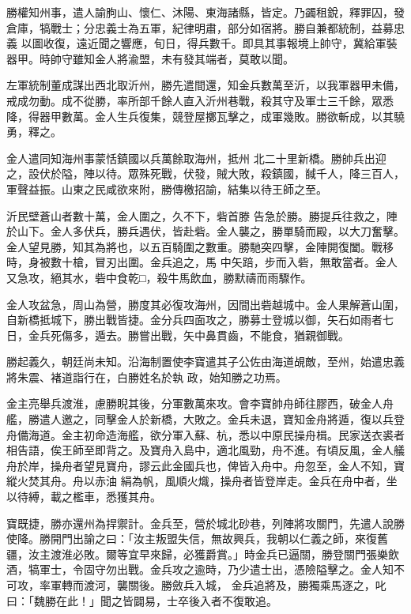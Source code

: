 \begin{pinyinscope}
 勝權知州事，遣人諭朐山、懷仁、沐陽、東海諸縣，皆定。乃蠲租銳，釋罪囚，發倉庫，犒戰士；分忠義士為五軍，紀律明肅，部分如宿將。勝自兼都統制，益募忠義
 以圖收復，遠近聞之響應，旬日，得兵數千。即具其事報境上帥守，冀給軍裝器甲。時帥守雖知金人將渝盟，未有發其端者，莫敢以聞。



 左軍統制董成謀出西北取沂州，勝先遣間還，知金兵數萬至沂，以我軍器甲未備，戒成勿動。成不從勝，率所部千餘人直入沂州巷戰，殺其守及軍士三千餘，眾悉降，得器甲數萬。金人生兵復集，競登屋擲瓦擊之，成軍幾敗。勝欲斬成，以其驍勇，釋之。



 金人遣同知海州事蒙恬鎮國以兵萬餘取海州，抵州
 北二十里新橋。勝帥兵出迎之，設伏於隘，陣以待。眾殊死戰，伏發，賊大敗，殺鎮國，馘千人，降三百人，軍聲益振。山東之民咸欲來附，勝傳檄招諭，結集以待王師之至。


沂民壁蒼山者數十萬，金人圍之，久不下，砦首滕
 告急於勝。勝提兵往救之，陣於山下。金人多伏兵，勝兵遇伏，皆赴砦。金人襲之，勝單騎而殿，以大刀奮擊。金人望見勝，知其為將也，以五百騎圍之數重。勝馳突四擊，金陣開復闔。戰移時，身被數十槍，冒刃出圍。金兵追之，馬
 中矢踣，步而入砦，無敢當者。金人又急攻，絕其水，砦中食乾□，殺牛馬飲血，勝默禱而雨驟作。



 金人攻盆急，周山為營，勝度其必復攻海州，因間出砦越城中。金人果解蒼山圍，自新橋抵城下，勝出戰皆捷。金分兵四面攻之，勝募士登城以御，矢石如雨者七日，金兵死傷多，遁去。勝嘗出戰，矢中鼻貫齒，不能食，猶親御戰。



 勝起義久，朝廷尚未知。沿海制置使李寶遣其子公佐由海道覘敵，至州，始遣忠義將朱震、褚道詣行在，白勝姓名於執
 政，始知勝之功焉。



 金主亮舉兵渡淮，慮勝睨其後，分軍數萬來攻。會李寶帥舟師往膠西，破金人舟艦，勝遣人邀之，同擊金人於新橋，大敗之。金兵未退，寶知金舟將遁，復以兵登舟備海道。金主初命造海艦，欲分軍入蘇、杭，悉以中原民操舟楫。民家送衣裘者相告語，俟王師至即背之。及寶舟入島中，適北風勁，舟不進。有頃反風，金人艤舟於岸，操舟者望見寶舟，謬云此金國兵也，俾皆入舟中。舟忽至，金人不知，寶縱火焚其舟。舟以赤油
 絹為帆，風順火熾，操舟者皆登岸走。金兵在舟中者，坐以待縛，載之檻車，悉獲其舟。



 寶既捷，勝亦還州為捍禦計。金兵至，營於城北砂巷，列陣將攻關門，先遣人說勝使降。勝開門出諭之曰：「汝主叛盟失信，無故興兵，我朝以仁義之師，來復舊疆，汝主渡淮必敗。爾等宜早來歸，必獲爵賞。」時金兵已逼關，勝登關門張樂飲酒，犒軍士，令固守勿出戰。金兵攻之逾時，乃少遣士出，憑險隘擊之。金人知不可攻，率軍轉而渡河，襲關後。勝斂兵入城，
 金兵追將及，勝獨乘馬逐之，叱曰：「魏勝在此！」聞之皆闢易，士卒後入者不復敢追。




\end{pinyinscope}
